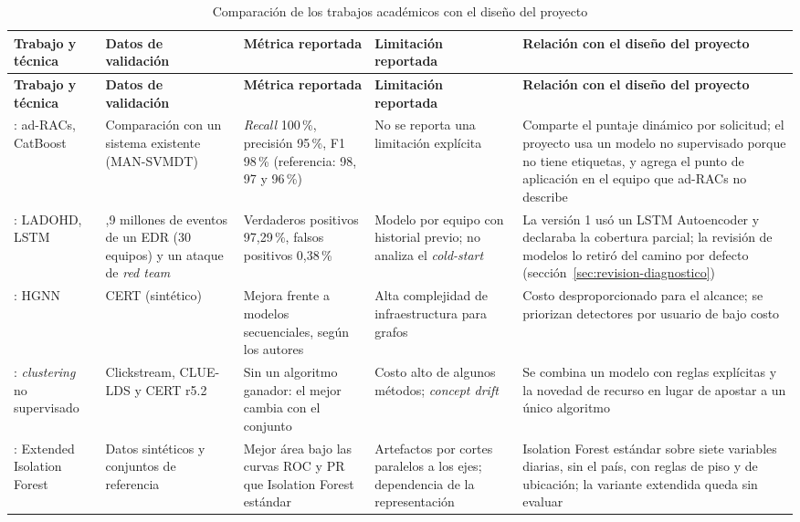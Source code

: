 {\footnotesize
\begin{longtable}{>{\raggedright\arraybackslash}p{2.2cm}>{\raggedright\arraybackslash}p{2.6cm}>{\raggedright\arraybackslash}p{2.6cm}>{\raggedright\arraybackslash}p{2.7cm}>{\raggedright\arraybackslash}p{3.5cm}}
	\caption{Comparación de los trabajos académicos con el diseño del proyecto}
	\label{tab:comparacion-algoritmos}\\
	\hline
	\textbf{Trabajo y técnica} & \textbf{Datos de validación} & \textbf{Métrica reportada} & \textbf{Limitación reportada} & \textbf{Relación con el diseño del proyecto} \\
	\hline
	\endfirsthead
	\hline
	\textbf{Trabajo y técnica} & \textbf{Datos de validación} & \textbf{Métrica reportada} & \textbf{Limitación reportada} & \textbf{Relación con el diseño del proyecto} \\
	\hline
	\endhead
	\textcite{Aliyu2024}: ad-RACs, CatBoost & Comparación con un sistema existente (MAN-SVMDT) & \emph{Recall} 100\,\%, precisión 95\,\%, F1 98\,\% (referencia: 98, 97 y 96\,\%) & No se reporta una limitación explícita & Comparte el puntaje dinámico por solicitud; el proyecto usa un modelo no supervisado porque no tiene etiquetas, y agrega el punto de aplicación en el equipo que ad-RACs no describe \\
	\hline
	\textcite{VillarrealVasquez2021}: LADOHD, LSTM & 38,9 millones de eventos de un EDR (30 equipos) y un ataque de \emph{red team} & Verdaderos positivos 97,29\,\%, falsos positivos 0,38\,\% & Modelo por equipo con historial previo; no analiza el \emph{cold-start} & La versión 1 usó un LSTM Autoencoder y declaraba la cobertura parcial; la revisión de modelos lo retiró del camino por defecto (sección~\ref{sec:revision-diagnostico}) \\
	\hline
	\textcite{Tian2023HGNN}: HGNN & CERT (sintético) & Mejora frente a modelos secuenciales, según los autores & Alta complejidad de infraestructura para grafos & Costo desproporcionado para el alcance; se priorizan detectores por usuario de bajo costo \\
	\hline
	\textcite{Artioli2024}: \emph{clustering} no supervisado & Clickstream, CLUE-LDS y CERT r5.2 & Sin un algoritmo ganador: el mejor cambia con el conjunto & Costo alto de algunos métodos; \emph{concept drift} & Se combina un modelo con reglas explícitas y la novedad de recurso en lugar de apostar a un único algoritmo \\
	\hline
	\textcite{Hariri2019}: Extended Isolation Forest & Datos sintéticos y conjuntos de referencia & Mejor área bajo las curvas ROC y PR que Isolation Forest estándar & Artefactos por cortes paralelos a los ejes; dependencia de la representación & Isolation Forest estándar sobre siete variables diarias, sin el país, con reglas de piso y de ubicación; la variante extendida queda sin evaluar \\

\end{longtable}}
